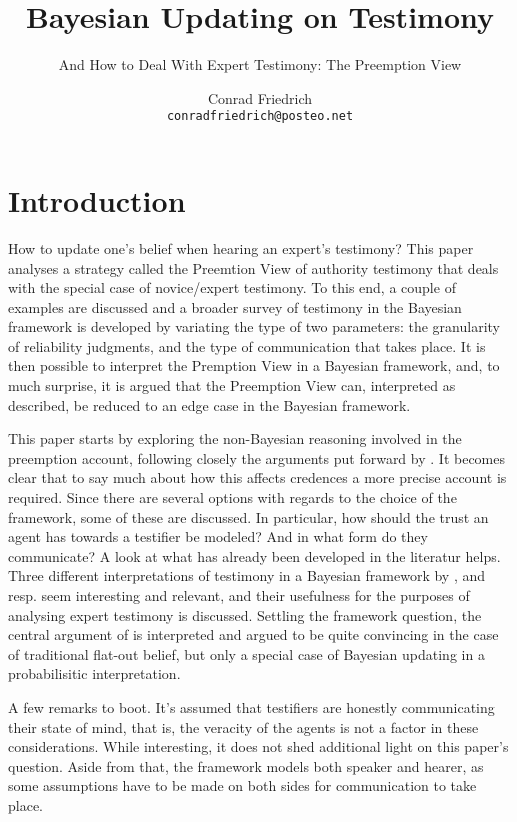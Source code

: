 \documentclass[11pt, a4paper]{scrartcl}
\title{\textbf{Bayesian Updating on Testimony} }
\subtitle{And How to Deal With Expert Testimony: The Preemption View}
\author{Conrad Friedrich \\ \texttt{conradfriedrich@posteo.net}}
\begin{document}
\maketitle
\thispagestyle{empty}
\tableofcontents
\newpage
\section{Introduction}
How to update one's belief when hearing an expert's testimony? This paper analyses a strategy called the Preemtion View of authority testimony that deals with the special case of novice/expert testimony. To this end, a couple of examples are discussed and a broader survey of testimony in the Bayesian framework is developed by variating the type of two parameters: the granularity of reliability judgments, and the type of communication that takes place. It is then possible to interpret the Premption View in a Bayesian framework, and, to much surprise, it is argued that the Preemption View can, interpreted as described, be reduced to an edge case in the Bayesian framework.

This paper starts by exploring the non-Bayesian reasoning involved in the preemption account, following closely the arguments put forward by \textcite{Constantin2017}. It becomes clear that to say much about how this affects credences a more precise account is required. Since there are several options with regards to the choice of the framework, some of these are discussed. In particular, how should the trust an agent has towards a testifier be modeled? And in what form do they communicate? A look at what has already been developed in the literatur helps. Three different interpretations of testimony in a Bayesian framework by \textcite{Goldman1999-GOLKIA}, \textcite{Bovens2003} and \textcite{Olsson2013} resp. \textcite{Angere2010} seem interesting and relevant, and their usefulness for the purposes of analysing expert testimony is discussed. Settling the framework question, the central argument of \textcite{Constantin2017} is interpreted and argued to be quite convincing in the case of traditional flat-out belief, but only a special case of Bayesian updating in a probabilisitic interpretation.

A few remarks to boot. It's assumed that testifiers are honestly communicating their state of mind, that is, the veracity of the agents is not a factor in these considerations. While interesting, it does not shed additional light on this paper's question. Aside from that, the framework models both speaker and hearer, as some assumptions have to be made on both sides for communication to take place. 
\end{document}
